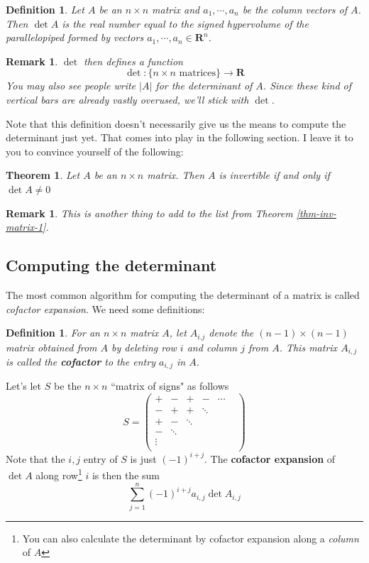 \documentclass[12pt]{article}
\numberwithin{equation}{subsection}
\numberwithin{figure}{subsection}
\newtheorem{thm}[subsection]{Theorem}
\newtheorem{defn}[subsection]{Definition}
\theoremstyle{note}
\newtheorem{remark}[subsection]{Remark}
\begin{document}
\begin{defn}
	Let $A$ be an $n\times n$ matrix and $a_1,\cdots, a_n$ be the column vectors of $A$. Then $\det A$ is the real number equal to the signed hypervolume of the parallelopiped formed by vectors $a_1,\cdots,a_n\in \mathbf{R}^n$.
\end{defn}

\begin{remark}$\det$ then defines a function \begin{equation} \det \colon \{ \text{$n\times n$ matrices}\} \to \mathbf{R}\end{equation}
You may also see people write $|A|$ for the determinant of $A$. Since these kind of vertical bars are already vastly overused, we'll stick with $\det$. \end{remark}
Note that this definition doesn't necessarily give us the means to compute the determinant just yet. That comes into play in the following section. I leave it to you to convince yourself of the following: 

\begin{thm}
	Let $A$ be an $n\times n$ matrix. Then $A$ is invertible if and only if $\det A\neq 0$ 
\end{thm}
\begin{remark}This is another thing to add to the list from Theorem \ref{thm-inv-matrix-1}.\end{remark}

\subsection{Computing the determinant}
The most common algorithm for computing the determinant of a matrix is called \textit{cofactor expansion}. We need some definitions: 

\begin{defn}For an $n\times n$ matrix $A$, let $A_{i.j}$ denote the $(n-1)\times (n-1)$ matrix obtained from $A$ by deleting row $i$ and column $j$ from $A$. This matrix $A_{i,j}$ is called the \textbf{cofactor} to the entry $a_{i,j}$ in $A$.
\end{defn} 

Let's let $S$ be the $n\times n$ ``matrix of signs" as follows
\begin{equation} S=\begin{pmatrix} 
+ & - & + & - & \cdots & \\ 
- & + & + & \ddots && \\
+ & - & \ddots &&& \\
- & \ddots &&&& \\
\vdots &&&&\\
&&&&&
\end{pmatrix}\end{equation}
Note that the $i,j$ entry of $S$ is just $(-1)^{i+j}$. The \textbf{cofactor expansion} of $\det A$ along row\footnote{You can also calculate the determinant by cofactor expansion along a \textit{column} of $A$} $i$ is then the sum
\begin{equation} \label{eqn-cof-i}
	 \sum_{j=1}^n (-1)^{i+j} a_{i,j} \det A_{i,j} 
\end{equation}
\end{document}
